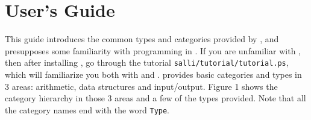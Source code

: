 % 
% 
% 
% 
% 
\section{User's Guide}

This guide introduces the common types and categories provided by \salli,
and presupposes some familiarity with programming in \aldor.
If you are unfamiliar with \aldor, then after installing \salli, go
through the tutorial
{\tt salli/tutorial/tutorial.ps}, which will familiarize you both with
\aldor and \salli.
\salli provides basic categories and types in 3 areas:
arithmetic, data structures and input/output. Figure 1 shows the
category hierarchy in those 3 areas and a few of the types provided.
Note that all the category names end with the word {\tt Type}.

